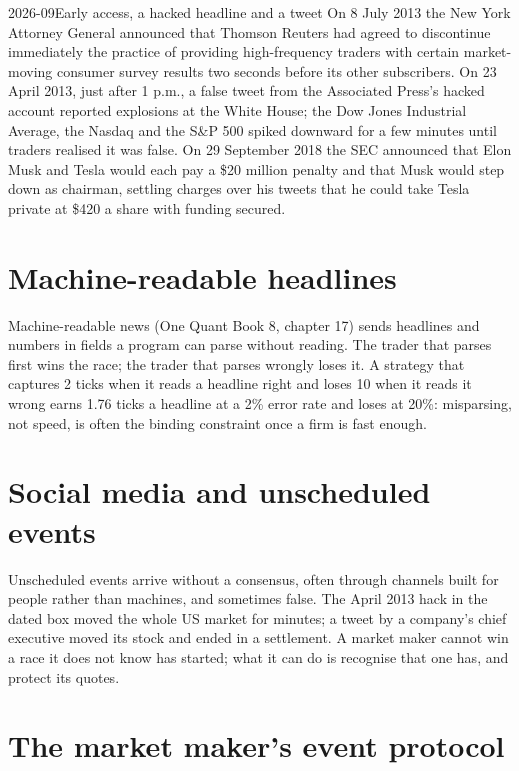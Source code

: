 \begin{dated}{2026-09}{Early access, a hacked headline and a tweet}\label{dat:hf:news-and-event-trading:events}
On 8 July 2013 the New York Attorney General announced that Thomson Reuters had agreed to discontinue immediately the practice of providing
high-frequency traders with certain market-moving consumer survey results two seconds before its other subscribers. On 23 April 2013, just after
1 p.m., a false tweet from the Associated Press's hacked account reported explosions at the White House; the Dow Jones Industrial Average, the
Nasdaq and the S\&P 500 spiked downward for a few minutes until traders realised it was false. On 29 September 2018 the SEC announced that Elon Musk
and Tesla would each pay a \$20 million penalty and that Musk would step down as chairman, settling charges over his tweets that he could take Tesla
private at \$420 a share with funding secured.
\end{dated}

\section{Machine-readable headlines}

Machine-readable news (One Quant Book 8, chapter 17) sends headlines and numbers in fields a program can parse without reading. The trader that
parses first wins the race; the trader that parses wrongly loses it. A strategy that captures 2 ticks when it reads a headline right and loses 10
when it reads it wrong earns 1.76 ticks a headline at a 2\% error rate and loses at 20\%: misparsing, not speed, is often the binding constraint
once a firm is fast enough.

\section{Social media and unscheduled events}

Unscheduled events arrive without a consensus, often through channels built for people rather than machines, and sometimes false. The
April 2013 hack in the dated box moved the whole US market for minutes; a tweet by a company's chief executive moved its stock and ended in a
settlement. A market maker cannot win a race it does not know has started; what it can do is recognise that one has, and protect its quotes.

\section{The market maker's event protocol}


